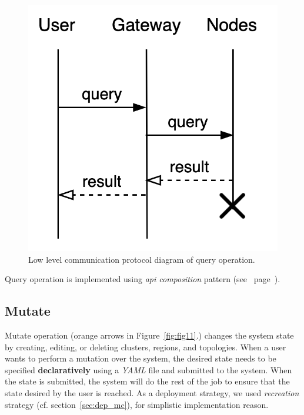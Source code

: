\begin{figure}[H]
	\begin{center}
		\includegraphics[scale=1]{images/Figure14}
	\end{center}
	\vspace{-0.7cm}
	\caption{Low level communication protocol diagram of query operation.}
	\label{fig:fig14}
\end{figure}

\noindent
Query operation is implemented using \emph{api composition} pattern (see ~page~\pageref{par:composition}).
%
%
\subsection{Mutate}\label{sec:mutate} 
%
Mutate operation (orange arrows in Figure~\ref{fig:fig11}.) changes the system state by creating, editing, or deleting clusters, regions, and topologies. When a user wants to perform a mutation over the system, the desired state needs to be specified \textbf{declaratively} using a \emph{YAML} file and submitted to the system. When the state is submitted, the system will do the rest of the job to ensure that the state desired by the user is reached. As a deployment strategy, we used \emph{recreation} strategy (cf. section~\ref{sec:dep_mc}), for simplistic implementation reason.


